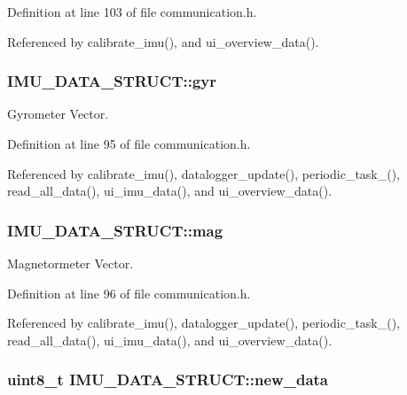 Definition at line 103 of file communication.h.



Referenced by calibrate\_\-imu(), and ui\_\-overview\_\-data().

\hypertarget{structIMU__DATA__STRUCT_a0c1ac26626e4434a2ee124a1928a23a1}{
\subsubsection[{gyr}]{ {\bf IMU\_\-DATA\_\-STRUCT::gyr}}}
\label{structIMU__DATA__STRUCT_a0c1ac26626e4434a2ee124a1928a23a1}


Gyrometer Vector. 



Definition at line 95 of file communication.h.



Referenced by calibrate\_\-imu(), datalogger\_\-update(), periodic\_\-task\_(), read\_\-all\_\-data(), ui\_\-imu\_\-data(), and ui\_\-overview\_\-data().

\hypertarget{structIMU__DATA__STRUCT_a40c7df8b6d49297aa52873cfd9b60daa}{
\subsubsection[{mag}]{ {\bf IMU\_\-DATA\_\-STRUCT::mag}}}
\label{structIMU__DATA__STRUCT_a40c7df8b6d49297aa52873cfd9b60daa}


Magnetormeter Vector. 



Definition at line 96 of file communication.h.



Referenced by calibrate\_\-imu(), datalogger\_\-update(), periodic\_\-task\_(), read\_\-all\_\-data(), ui\_\-imu\_\-data(), and ui\_\-overview\_\-data().

\hypertarget{structIMU__DATA__STRUCT_a99924252176326418863e511d4fa437b}{
\subsubsection[{new\_\-data}]{\setlength{\rightskip}{0pt plus 5cm}uint8\_\-t {\bf IMU\_\-DATA\_\-STRUCT::new\_\-data}}}
\label{structIMU__DATA__STRUCT_a99924252176326418863e511d4fa437b}


